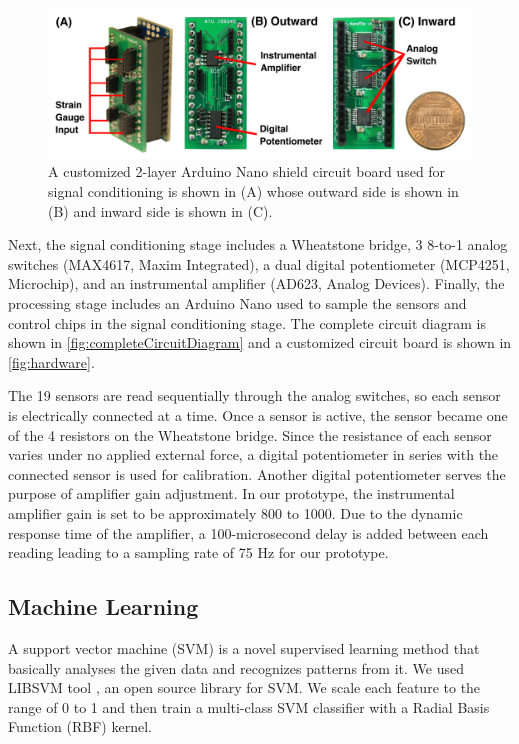 \documentclass{sigchi}
\begin{document}
\begin{figure}[b]
  \begin{center}
  \includegraphics[width=1\columnwidth]{figures/harwareV2.jpg}
  \caption{ A customized 2-layer Arduino Nano shield circuit board used for signal conditioning is shown in (A) whose outward side is shown in (B) and inward side is shown in (C).}
  \label{fig:hardware}
  \end{center}
\end{figure}

Next, the signal conditioning stage includes a Wheatstone bridge, 3 8-to-1 analog switches (MAX4617, Maxim Integrated), a dual digital potentiometer (MCP4251, Microchip), and an instrumental amplifier (AD623, Analog Devices). Finally, the processing stage includes an Arduino Nano used to sample the sensors and control chips in the signal conditioning stage. The complete circuit diagram is shown in \autoref{fig:completeCircuitDiagram} and a customized circuit board is shown in \autoref{fig:hardware}.

The 19 sensors are read sequentially through the analog switches, so each sensor is electrically connected at a time. Once a sensor is active, the sensor became one of the 4 resistors on the Wheatstone bridge. Since the resistance of each sensor varies under no applied external force, a digital potentiometer in series with the connected sensor is used for calibration. Another digital potentiometer serves the purpose of amplifier gain adjustment. In our prototype, the instrumental amplifier gain is set to be approximately 800 to 1000. Due to the dynamic response time of the amplifier, a 100-microsecond delay is added between each reading leading to a sampling rate of 75 Hz for our prototype.


\subsection{Machine Learning}
A support vector machine (SVM) is a novel supervised learning method that basically analyses the given data and recognizes patterns from it.
We used LIBSVM tool \cite{CC01a}, an open source library for SVM. 
We scale each feature to the range of 0 to 1 and then train a multi-class SVM classifier with a Radial Basis Function (RBF) kernel.
\end{document}
